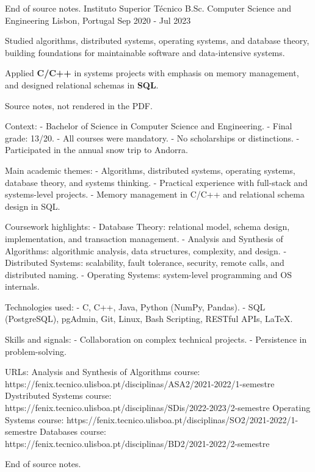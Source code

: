 \begin{cventries}
{      End of source notes.
    }
  \cventry
    {Instituto Superior Técnico} %
    {B.Sc. Computer Science and Engineering} %
    {Lisbon, Portugal} %
    {Sep 2020 - Jul 2023} %
    {
      \begin{cvitems}
        \item {Studied algorithms, distributed systems, operating systems, and database theory, building foundations for maintainable software and data-intensive systems.}
        \item {Applied \textbf{C/C++} in systems projects with emphasis on memory management, and designed relational schemas in \textbf{SQL}.}
      \end{cvitems}
    }
    {
      Source notes, not rendered in the PDF.

      Context:
      - Bachelor of Science in Computer Science and Engineering.
      - Final grade: 13/20.
      - All courses were mandatory.
      - No scholarships or distinctions.
      - Participated in the annual snow trip to Andorra.

      Main academic themes:
      - Algorithms, distributed systems, operating systems, database theory, and systems thinking.
      - Practical experience with full-stack and systems-level projects.
      - Memory management in C/C++ and relational schema design in SQL.

      Coursework highlights:
      - Database Theory: relational model, schema design, implementation, and transaction management.
      - Analysis and Synthesis of Algorithms: algorithmic analysis, data structures, complexity, and design.
      - Distributed Systems: scalability, fault tolerance, security, remote calls, and distributed naming.
      - Operating Systems: system-level programming and OS internals.

      Technologies used:
      - C, C++, Java, Python (NumPy, Pandas).
      - SQL (PostgreSQL), pgAdmin, Git, Linux, Bash Scripting, RESTful APIs, LaTeX.

      Skills and signals:
      - Collaboration on complex technical projects.
      - Persistence in problem-solving.

      URLs:
      Analysis and Synthesis of Algorithms course: https://fenix.tecnico.ulisboa.pt/disciplinas/ASA2/2021-2022/1-semestre
      Dystributed Systems course: https://fenix.tecnico.ulisboa.pt/disciplinas/SDis/2022-2023/2-semestre
      Operating Systems course: https://fenix.tecnico.ulisboa.pt/disciplinas/SO2/2021-2022/1-semestre
      Databases course: https://fenix.tecnico.ulisboa.pt/disciplinas/BD2/2021-2022/2-semestre

      End of source notes.
    }
\end{cventries}
